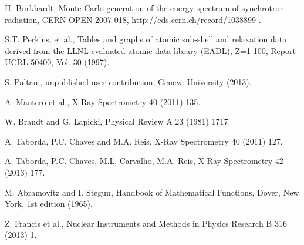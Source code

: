  H. Burkhardt, Monte Carlo generation of the energy spectrum of synchrotron
                    radiation,
                    CERN-OPEN-2007-018, \url{http://cds.cern.ch/record/1038899} . 

 S.T. Perkins, et al., Tables and graphs of atomic sub-shell and
                     relaxation data derived from the LLNL evaluated atomic data
                     library (EADL), Z=1-100, Report UCRL-50400, Vol. 30 (1997).

 S. Paltani, unpublished user contribution, Geneva 
                         University (2013).

 A. Mantero et al.,
                     X-Ray Spectrometry 40 (2011) 135.


 W. Brandt and G. Lapicki, 
                      Physical Review A 23 (1981) 1717.

 A. Taborda, P.C. Chaves and M.A. Reis,
                      X-Ray Spectrometry 40 (2011) 127.

 A. Taborda, P.C. Chaves, M.L. Carvalho, M.A. Reis, 
                      X-Ray Spectrometry 42 (2013) 177.

 M. Abramovitz and I. Stegun, Handbook of Mathematical Functions,
                      Dover, New York, 1st edition (1965).

 Z. Francis et al.,
                      Nuclear Instruments and Methods in Physics Research B 316 (2013) 1.

